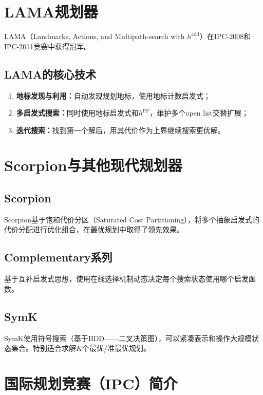 \section{LAMA规划器 \ug}

LAMA（Landmarks, Actions, and Multipath-search with $h^{\mathrm{add}}$）在IPC-2008和IPC-2011竞赛中获得冠军。

\subsection{LAMA的核心技术}
\begin{enumerate}
  \item \textbf{地标发现与利用：}自动发现规划地标，使用地标计数启发式；
  \item \textbf{多启发式搜索：}同时使用地标启发式和$h^{\mathrm{FF}}$，维护多个open list交替扩展；
  \item \textbf{迭代搜索：}找到第一个解后，用其代价作为上界继续搜索更优解。
\end{enumerate}

\section{Scorpion与其他现代规划器 \grad}

\subsection{Scorpion}

Scorpion基于饱和代价分区（Saturated Cost Partitioning），将多个抽象启发式的代价分配进行优化组合，在最优规划中取得了领先效果。

\subsection{Complementary系列}

基于互补启发式思想，使用在线选择机制动态决定每个搜索状态使用哪个启发函数。

\subsection{SymK}

SymK使用符号搜索（基于BDD——二叉决策图），可以紧凑表示和操作大规模状态集合。特别适合求解$K$个最优/准最优规划。

\section{国际规划竞赛（IPC）简介 \self}

